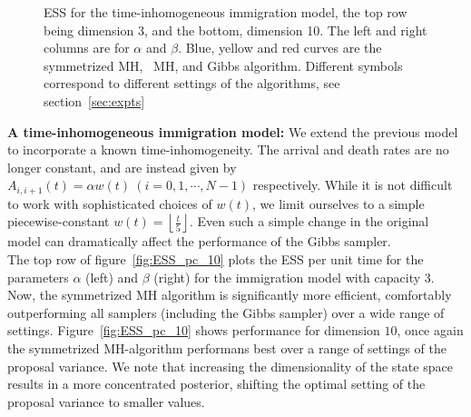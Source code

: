 \begin{figure}[H]
\begin{minipage}[hp]{0.24\linewidth}
	\end{minipage}
    \caption{ESS for the time-inhomogeneous immigration model, the top row being dimension 3, and the bottom, dimension 10. The left and right columns are for $\alpha$ and $\beta$. Blue, yellow and red curves are the symmetrized MH, \naive\ MH, and Gibbs algorithm. Different symbols correspond to different settings of the algorithms, see section~\ref{sec:expts}}
     \label{fig:ESS_CQ_notpersec}
  \end{figure}


\textbf{A time-inhomogeneous immigration model:}
We extend the previous model to incorporate a known time-inhomogeneity. 
The arrival and death rates are no longer constant, and are instead given by
$A_{i, i+1}(t) = \alpha w(t) \ (i =0,1,\cdots,N-1)$ respectively.
While it is not difficult to work with sophisticated choices of $w(t)$,
we limit ourselves to a simple piecewise-constant 
$w(t) = \left\lfloor \frac{t}{5} \right\rfloor$. Even such a simple
change in the original model can dramatically affect the performance
of the Gibbs sampler. \\
 The top row of figure~\ref{fig:ESS_pc_10} plots the ESS per unit time for the 
 parameters $\alpha$ (left) and $\beta$ (right) for the immigration model with 
 capacity $3$.  Now, the symmetrized MH algorithm is significantly 
 more efficient, comfortably outperforming all samplers (including the Gibbs 
 sampler) over a wide range of settings. %
 Figure~\ref{fig:ESS_pc_10} shows performance for dimension
 $10$, once again the symmetrized MH-algorithm performans best over a 
 range of settings of the proposal variance. We note that increasing the
 dimensionality of the state space results in a more concentrated posterior,
 shifting the optimal setting of the proposal variance to smaller values.

